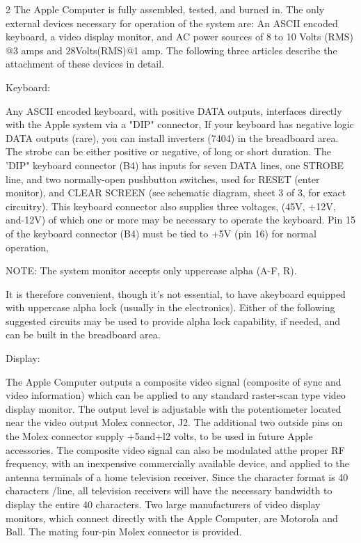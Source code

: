 \documentclass[letterpaper]{article}
\begin{document}
\begin{multicols}{2}
The Apple Computer is fully assembled, tested, and burned in. The only external devices necessary for operation of the system are: An ASCII encoded keyboard, a video display monitor, and AC power sources of 8 to 10 Volts (RMS) @3 amps and 28Volts(RMS)@1 amp. The following three articles describe the attachment of these devices in detail.

\noindent Keyboard:

Any ASCII encoded keyboard, with positive DATA outputs, interfaces directly with the Apple system via a "DIP" connector, If your keyboard has negative logic DATA outputs (rare), you can install inverters (7404) in the breadboard area. The strobe can be either positive or negative, of long or short duration. The 'DIP" keyboard connector (B4) has inputs for seven DATA lines, one STROBE line, and two normally-open pushbutton switches, used for RESET (enter monitor), and CLEAR SCREEN (see schematic diagram, sheet 3 of 3, for exact circuitry). This keyboard connector also supplies three voltages, (45V, +12V, and-12V) of which one or more may be necessary to operate the keyboard. Pin 15 of the keyboard connector (B4) must be tied to +5V (pin 16) for normal operation,

\noindent NOTE: The system monitor accepts only uppercase alpha (A-F, R).

It is therefore convenient, though it's not essential, to have akeyboard equipped with uppercase alpha lock (usually in the electronics). Either of the following suggested circuits may be used to provide alpha lock capability, if needed, and can be built in the breadboard area.

\newpage
\noindent Display:

The Apple Computer outputs a composite video signal (composite of sync and video information) which can be applied to any standard raster-scan type video display monitor. The output level is adjustable with the potentiometer located near the video output Molex connector, J2. The additional two outside pins on the Molex connector supply +5and+l2 volts, to be used in future Apple accessories. The composite video signal can also be modulated atthe proper RF frequency, with an inexpensive commercially available device, and applied to the antenna terminals of a home television receiver. Since the character format is 40 characters /line, all television receivers will have the necessary bandwidth to display the entire 40 characters. Two large manufacturers of video display monitors, which connect directly with the Apple Computer, are Motorola and Ball. The mating four-pin Molex connector is provided.


\end{multicols}
\end{document}
